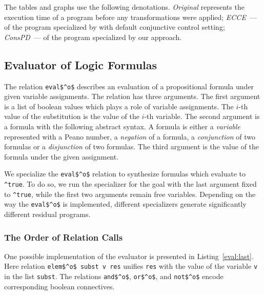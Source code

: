 The tables and graphs use the following denotations.
\emph{Original} represents the execution time of a program before any transformations were applied; \emph{ECCE}~--- of the program specialized by \ecce with default conjunctive control setting; \emph{ConsPD}~--- of the program specialized by our approach.

\subsection{Evaluator of Logic Formulas}

The relation \lstinline{eval$^o$} describes an evaluation of a propositional formula under given variable assignments.
The relation has three arguments. The first argument is a list of boolean values which plays a role of variable assignments.
The $i$-th value of the substitution is the value of the $i$-th variable.
The second argument is a formula with the following abstract syntax.
A formula is either a \emph{variable} represented with a Peano number, a \emph{negation} of a formula, a \emph{conjunction} of two formulas or a \emph{disjunction} of two formulas.
The third argument is the value of the formula under the given assignment.

We specialize the \lstinline{eval$^o$} relation to synthesize formulas which evaluate to \lstinline{^true}.
To do so, we run the specializer for the goal with the last argument fixed to \lstinline{^true}, while the first two arguments remain free variables.
Depending on the way the \lstinline{eval$^o$} is implemented, different specializers generate significantly different residual programs.

\subsubsection{The Order of Relation Calls}

One possible implementation of the evaluator is presented in Listing~\ref{eval:last}.
Here relation \lstinline{elem$^o$ subst v res} unifies \lstinline{res} with the value of the variable \lstinline{v} in the list \lstinline{subst}.
The relations \lstinline{and$^o$}, \lstinline{or$^o$}, and \lstinline{not$^o$} encode corresponding boolean connectives.

